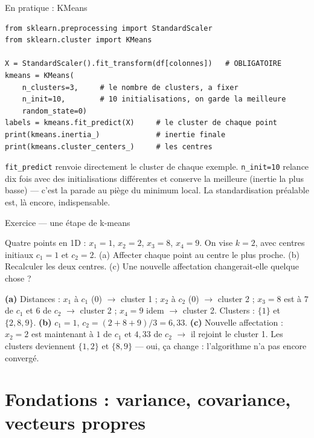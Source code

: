 \documentclass[aspectratio=169,11pt]{beamer}
\begin{document}
\begin{frame}[fragile]{En pratique : KMeans}
\begin{lstlisting}
from sklearn.preprocessing import StandardScaler
from sklearn.cluster import KMeans

X = StandardScaler().fit_transform(df[colonnes])   # OBLIGATOIRE
kmeans = KMeans(
    n_clusters=3,     # le nombre de clusters, a fixer
    n_init=10,        # 10 initialisations, on garde la meilleure
    random_state=0)
labels = kmeans.fit_predict(X)     # le cluster de chaque point
print(kmeans.inertia_)             # inertie finale
print(kmeans.cluster_centers_)     # les centres
\end{lstlisting}
{\small \texttt{fit\_predict} renvoie directement le cluster de chaque exemple. \texttt{n\_init=10} relance dix fois avec des initialisations différentes et conserve la meilleure (inertie la plus basse) — c'est la parade au piège du minimum local. La standardisation préalable est, là encore, indispensable.}
\end{frame}

\begin{frame}{Exercice — une étape de k-means}
\begin{ucadrec}[Énoncé]
{\small Quatre points en 1D : $x_1 = 1$, $x_2 = 2$, $x_3 = 8$, $x_4 = 9$. On vise $k=2$, avec centres initiaux $c_1 = 1$ et $c_2 = 2$. (a) Affecter chaque point au centre le plus proche. (b) Recalculer les deux centres. (c) Une nouvelle affectation changerait-elle quelque chose ?}
\end{ucadrec}
\pause
\begin{ucadex}[Correction]
{\small \textbf{(a)} Distances : $x_1$ à $c_1$ ($0$) $\to$ cluster 1 ; $x_2$ à $c_2$ ($0$) $\to$ cluster 2 ; $x_3 = 8$ est à $7$ de $c_1$ et $6$ de $c_2$ $\to$ cluster 2 ; $x_4 = 9$ idem $\to$ cluster 2. Clusters : $\{1\}$ et $\{2, 8, 9\}$. \textbf{(b)} $c_1 = 1$, $c_2 = (2+8+9)/3 = 6{,}33$. \textbf{(c)} Nouvelle affectation : $x_2 = 2$ est maintenant à $1$ de $c_1$ et $4{,}33$ de $c_2$ $\to$ il rejoint le cluster 1. Les clusters deviennent $\{1,2\}$ et $\{8,9\}$ — oui, ça change : l'algorithme n'a pas encore convergé.}
\end{ucadex}
\end{frame}

\section{Fondations : variance, covariance, vecteurs propres}
\end{document}
